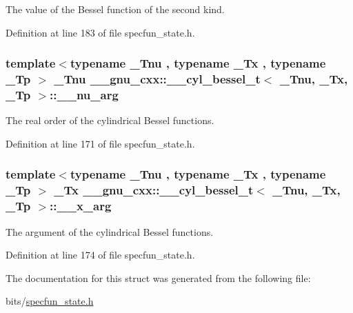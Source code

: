 The value of the Bessel function of the second kind. 



Definition at line 183 of file specfun\+\_\+state.\+h.

\subsubsection[{\texorpdfstring{\+\_\+\+\_\+nu\+\_\+arg}{__nu_arg}}]{\setlength{\rightskip}{0pt plus 5cm}template$<$typename \+\_\+\+Tnu , typename \+\_\+\+Tx , typename \+\_\+\+Tp $>$ \+\_\+\+Tnu {\bf \+\_\+\+\_\+gnu\+\_\+cxx\+::\+\_\+\+\_\+cyl\+\_\+bessel\+\_\+t}$<$ \+\_\+\+Tnu, \+\_\+\+Tx, \+\_\+\+Tp $>$\+::\+\_\+\+\_\+nu\+\_\+arg}\hypertarget{struct____gnu__cxx_1_1____cyl__bessel__t_a3d17d7f7196d7aef725228cf02269195}{}\label{struct____gnu__cxx_1_1____cyl__bessel__t_a3d17d7f7196d7aef725228cf02269195}


The real order of the cylindrical Bessel functions. 



Definition at line 171 of file specfun\+\_\+state.\+h.

\subsubsection[{\texorpdfstring{\+\_\+\+\_\+x\+\_\+arg}{__x_arg}}]{\setlength{\rightskip}{0pt plus 5cm}template$<$typename \+\_\+\+Tnu , typename \+\_\+\+Tx , typename \+\_\+\+Tp $>$ \+\_\+\+Tx {\bf \+\_\+\+\_\+gnu\+\_\+cxx\+::\+\_\+\+\_\+cyl\+\_\+bessel\+\_\+t}$<$ \+\_\+\+Tnu, \+\_\+\+Tx, \+\_\+\+Tp $>$\+::\+\_\+\+\_\+x\+\_\+arg}\hypertarget{struct____gnu__cxx_1_1____cyl__bessel__t_aac526f7bf86ebf0201e46545d9927f15}{}\label{struct____gnu__cxx_1_1____cyl__bessel__t_aac526f7bf86ebf0201e46545d9927f15}


The argument of the cylindrical Bessel functions. 



Definition at line 174 of file specfun\+\_\+state.\+h.



The documentation for this struct was generated from the following file\+:\begin{DoxyCompactItemize}
\item 
bits/\hyperlink{specfun__state_8h}{specfun\+\_\+state.\+h}\end{DoxyCompactItemize}
